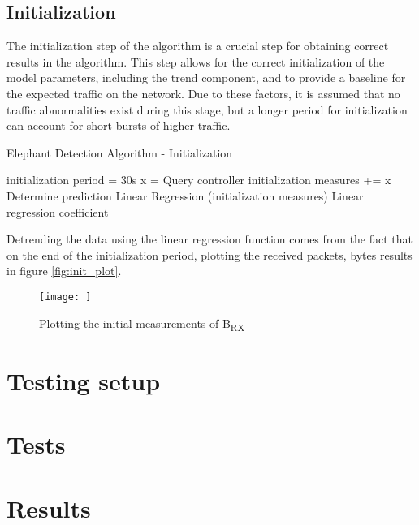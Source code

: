 \subsection{Initialization}

The initialization step of the algorithm is a crucial step for obtaining correct results in the algorithm. This step allows for the correct initialization of the model parameters, including the trend component, and to provide a 
baseline for the expected traffic on the network. Due to these factors, it is assumed that no traffic abnormalities exist during this stage, but a longer period for initialization can account for short bursts of higher traffic.

\begin{algorithm}[H]
    \caption{Elephant Detection Algorithm - Initialization} \label{alg:high_level}
    \begin{algorithmic}[1]
            \State initialization period = 30s
                \State x = Query controller
                \State initialization measures += x
                \State Determine prediction
            \EndWhile
            \State Linear Regression (initialization measures)
        \State \Return Linear regression coefficient
    \end{algorithmic}
\end{algorithm}

\par Detrending the data using the linear regression function comes from the fact that on the end of the initialization period, plotting the received packets, bytes results in figure \ref{fig:init_plot}.

\begin{figure} 
    \centering
    \texttt{[image: ]}
    \caption {Plotting the initial measurements of B\textsubscript{RX}}
    \label{fig:test_setup}
\end{figure} 

\section {Testing setup}
\section {Tests}
\section {Results}

